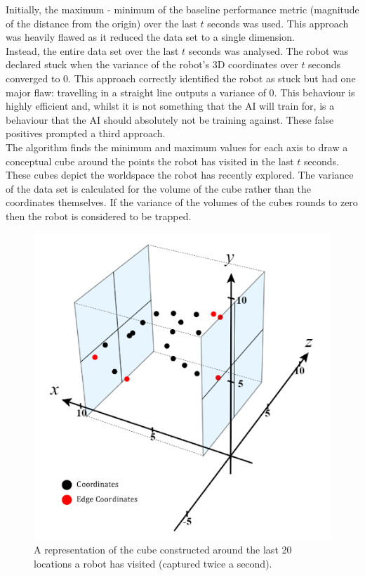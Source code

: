 \documentclass{article}
\begin{document}
Initially, the maximum - minimum of the baseline performance metric (magnitude of the distance from the origin) over the last $t$ seconds was used. This approach was heavily flawed as it reduced the data set to a single dimension. \\
Instead, the entire data set over the last $t$ seconds was analysed. The robot was declared stuck when the variance of the robot’s 3D coordinates over $t$ seconds converged to 0. This approach correctly identified the robot as stuck but had one major flaw: travelling in a straight line outputs a variance of 0. This behaviour is highly efficient and, whilst it is not something that the AI will train for, is a behaviour that the AI should absolutely not be training against. These false positives prompted a third approach. \\
The algorithm finds the minimum and maximum values for each axis to draw a conceptual cube around the points the robot has visited in the last $t$ seconds. These cubes depict the  worldspace the robot has recently explored. The variance of the data set is calculated for the volume of the cube rather than the coordinates themselves. If the variance of the volumes of the cubes rounds to zero then the robot is considered to be trapped. \\
\begin{figure}[H]
\centering
\includegraphics[scale=0.7]{trappedAlgorithm}
\caption{A representation of the cube constructed around the last 20 locations a robot has visited (captured twice a second).}
\end{figure}
\end{document}

